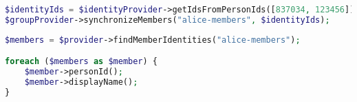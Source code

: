 \begin{lstlisting}[language=PHP,label={code:sync-groups},caption={Example of how to syncronize group members using the Authorization Service package.}]
$identityIds = $identityProvider->getIdsFromPersonIds([837034, 123456]);
$groupProvider->synchronizeMembers("alice-members", $identityIds);
\end{lstlisting}


\begin{lstlisting}[language=PHP,label={code:fetch-group-members},caption={Example of how to fetch group members using the Authorization Service package}]
$members = $provider->findMemberIdentities("alice-members");

foreach ($members as $member) {
	$member->personId();
	$member->displayName();
}
\end{lstlisting}
